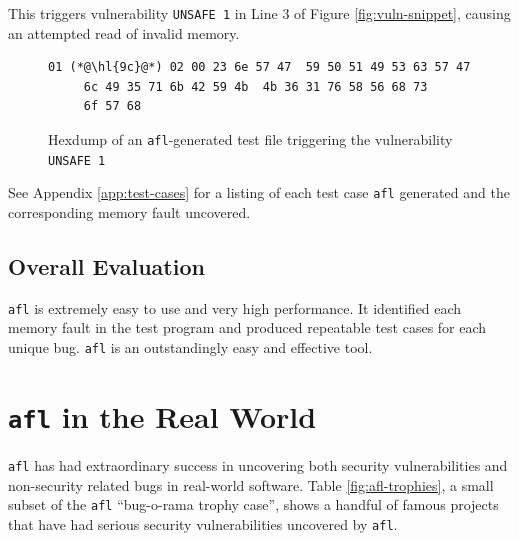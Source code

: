 This triggers vulnerability \texttt{UNSAFE 1} in Line 3 of Figure \ref{fig:vuln-snippet}, causing an attempted read of invalid memory.

\begin{figure}[H]
    \begin{lstlisting}[language={},basicstyle=\small]
     01 (*@\hl{9c}@*) 02 00 23 6e 57 47  59 50 51 49 53 63 57 47
     6c 49 35 71 6b 42 59 4b  4b 36 31 76 58 56 68 73
     6f 57 68\end{lstlisting}
\caption{Hexdump of an \texttt{afl}-generated test file triggering the vulnerability \texttt{UNSAFE 1}}
\label{fig:hexdump}
\end{figure}

See Appendix \ref{app:test-cases} for a listing of each test case \texttt{afl}
generated and the corresponding memory fault uncovered.

\subsection{Overall Evaluation}

\texttt{afl} is extremely easy to use and very high performance. It identified
each memory fault in the test program and produced repeatable test cases
for each unique bug. \texttt{afl} is an outstandingly easy and effective
tool.

\section{\texttt{afl} in the Real World}

\texttt{afl} has had extraordinary success in uncovering both security
vulnerabilities and non-security related bugs in real-world software. Table
\ref{fig:afl-trophies}, a small subset of the \texttt{afl} ``bug-o-rama trophy case''\cite{afl-trophy-case},
shows a handful of famous projects that have had serious security
vulnerabilities uncovered by \texttt{afl}.

